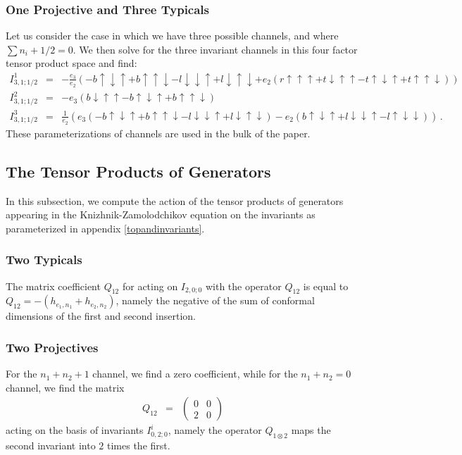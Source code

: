 \documentclass[12pt]{article}
\numberwithin{equation}{section}
\numberwithin{equation}{section}
\numberwithin{table}{section}\setlength{\multlinegap}{25pt}
\begin{document}
\subsubsection{One Projective and Three Typicals}
 Let us consider the case in which we have
three possible channels, and where $\sum n_i +1/2=0$. We then solve for the three
invariant channels in this four factor tensor product space and find:
\begin{eqnarray}
I_{3,1;1/2}^1 &=& -\frac{e_3}{ e_2} 
(-b \! \uparrow \downarrow \uparrow + b \! \uparrow \uparrow \downarrow - l \! \downarrow \downarrow \uparrow + l \! \downarrow \uparrow \downarrow + e_2 
(r \! \uparrow \uparrow \uparrow + t \! \downarrow \uparrow \uparrow - t \! \uparrow \downarrow \uparrow + t \!
\uparrow \uparrow \downarrow)) 
\nonumber \\
I_{3,1;1/2}^2 &=& -e_3 (b \! \downarrow \uparrow \uparrow- b \! \uparrow \downarrow \uparrow + b \! \uparrow \uparrow \downarrow)
\nonumber \\
I_{3,1;1/2}^3 &=& \frac{1}{ e_2} (e_3(- b \! \uparrow \downarrow \uparrow + b \! \uparrow \uparrow \downarrow - l \! \downarrow \downarrow \uparrow + l \! \downarrow \uparrow \downarrow)
- e_2 ( b \! \uparrow \downarrow \uparrow + l \! \downarrow \downarrow \uparrow - l \! \uparrow \downarrow \downarrow)) \, .
\label{threechannels}
\end{eqnarray}
These parameterizations of channels are used in the bulk of the paper.


\subsection{The Tensor Products of Generators}
\label{Qs}
In this subsection, we compute the action of the tensor products of generators appearing in the Knizhnik-Zamolodchikov equation on the invariants
as parameterized in appendix \ref{topandinvariants}.
\subsubsection{Two Typicals}
The matrix coefficient $Q_{12}$ for acting on $I_{2,0;0}$ with the operator $Q_{12}$ is equal to $Q_{12}=-(h_{e_1,n_1}+h_{e_2,n_2})$, namely
the negative of the sum of conformal dimensions of the first and second insertion.
\subsubsection{Two Projectives}
For the $n_1+n_2+1$ channel, we find a zero coefficient, while for the $n_1+n_2=0$ channel, we find the matrix
\begin{eqnarray}
Q_{12} &=& \left( \begin{array}{cc}
0 & 0 \\
2  & 0 
\end{array}
\right)
\end{eqnarray}
acting on the basis of invariants $I_{0,2;0}^i$, namely the operator $Q_{1 \otimes 2}$ maps the second invariant into $2$ times the first.
\end{document}
